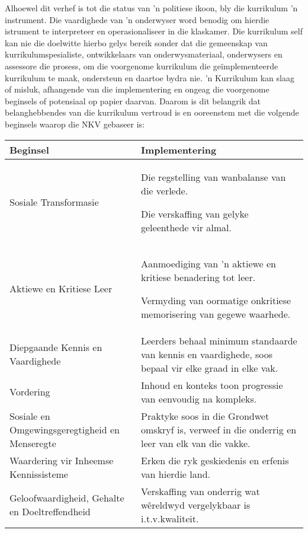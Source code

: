 Alhoewel dit verhef is tot die status van 'n politiese ikoon, bly die
kurrikulum 'n instrument. Die vaardighede van 'n onderwyser word
benodig om hierdie istrument te interpreteer en operasionaliseer in
die klaskamer.
Die kurrikulum self kan nie die doelwitte hierbo gelys bereik sonder
dat die gemeenskap van kurrikulumspesialiste, ontwikkelaars van
onderwysmateriaal, onderwysers en assessore die prosess, om die
voorgenome kurrikulum die ge\"{i}mplementeerde kurrikulum te maak,
ondersteun en daartoe bydra nie.
'n Kurrikulum kan slaag of misluk, afhangende van die implementering
en ongeag die voorgenome beginsels of potensiaal op papier daarvan.
Daarom is dit belangrik dat belanghebbendes van die kurrikulum
vertroud is en ooreenstem met die volgende beginsels waarop die NKV
gebaseer is:

\begin{table}[H]
\begin{center}
\begin{tabular}{|p{6.5cm}|p{6.5cm}|} \hline
\textbf{Beginsel} &
\textbf{Implementering} \\ \hline
Sosiale Transformasie &
Die regstelling van wanbalanse van die verlede.\par
Die verskaffing van gelyke geleenthede vir almal.\\ \hline
Aktiewe en Kritiese Leer &
Aanmoediging van 'n aktiewe en kritiese benadering tot leer.\par
Vermyding van oormatige onkritiese memorisering van gegewe waarhede.\\ \hline
Diepgaande Kennis en Vaardighede &
Leerders behaal minimum standaarde van kennis en vaardighede, soos
bepaal vir elke graad in elke vak. \\ \hline
Vordering &
Inhoud en konteks toon progressie van eenvoudig na kompleks. \\ \hline
Sosiale en Omgewingsgeregtigheid en Menseregte &
Praktyke soos in die Grondwet omskryf is, verweef in die onderrig en
leer van elk van die vakke. \\ \hline
Waardering vir Inheemse Kennissisteme &
Erken die ryk geskiedenis en erfenis van hierdie land. \\ \hline
Geloofwaardigheid, Gehalte en Doeltreffendheid &
Verskaffing van onderrig wat w\^{e}reldwyd vergelykbaar is i.t.v.\@ kwaliteit. \\ \hline
\end{tabular}
\end{center}
\end{table}

